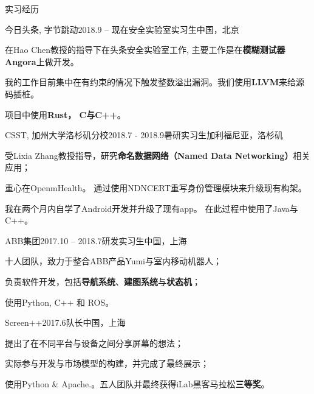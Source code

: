 \documentclass{resume} %
\begin{document}
\begin{rSection}{实习经历}

\begin{rSubsection}
  {今日头条, 字节跳动}{2018.9 – 现在}{安全实验室实习生}{中国，北京}
    \item 在Hao Chen教授的指导下在头条安全实验室工作, 主要工作是在\textbf{模糊测试器 Angora}上做开发。
    \item 我的工作目前集中在有约束的情况下触发整数溢出漏洞。我们使用\textbf{LLVM}来给源码插桩。
    \item 项目中使用\textbf{Rust， C与C++}。
\end{rSubsection}


\begin{rSubsection}
  {CSST, 加州大学洛杉矶分校}{2018.7 - 2018.9}{暑研实习生}{加利福尼亚，洛杉矶}
    \item 受Lixia Zhang教授指导，研究\textbf{命名数据网络（Named Data Networking）}相关应用；
    \item 重心在OpenmHealth。 通过使用NDNCERT重写身份管理模块来升级现有构架。
    \item 我在两个月内自学了Android开发并升级了现有app。 在此过程中使用了Java与C++。
\end{rSubsection}


\begin{rSubsection}
  {ABB集团}{2017.10 – 2018.7}{研发实习生}{中国，上海}
    \item 十人团队，致力于整合ABB产品Yumi与室内移动机器人；
    \item 负责软件开发，包括\textbf{导航系统}、\textbf{建图系统}与\textbf{状态机}；
    \item 使用Python, C++ 和 ROS。
\end{rSubsection}


\begin{rSubsection}
  {Screen++}{2017.6}{队长}{中国，上海}
    \item 提出了在不同平台与设备之间分享屏幕的想法；
    \item 实际参与开发与市场模型的构建，并完成了最终展示；
    \item 使用Python \& Apache.。五人团队并最终获得iLab黑客马拉松\textbf{三等奖}。
\end{rSubsection}

\end{rSection}
\end{document}
